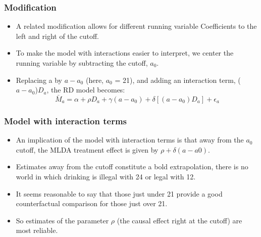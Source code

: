 \documentclass{beamer}
\begin{document}
\begin{frame}
\frametitle{Modification}
\begin{itemize}
	\item A related modification allows for different running variable Coefficients to the left and right of the cutoff.
	\item To make the model with interactions easier to interpret, we center the running variable by subtracting the cutoff, $a_0$. 
	\item Replacing a by $a - a_0$ (here, $a_0$ = 21), and adding an interaction term, ($a - a_0$)$D_a$, the RD model becomes:
$$\bar{M}_a=\alpha + \rho D_a + \gamma (a - a_0) + \delta[(a - a_0)D_a] + \epsilon_a $$
\end{itemize}

\end{frame}
\begin{frame}
\frametitle{Model with interaction terms}
\begin{itemize}
	\item An implication of the model with interaction terms is that away from the $a_0$ cutoff, the MLDA treatment effect is given by $\rho + \delta(a - a0)$.
	\item Estimates away from the cutoff constitute a bold extrapolation, there is no world in which drinking is illegal with 24 or legal with 12.
	\item It seems reasonable to say that those just under 21 provide a good counterfactual comparison for those just over 21. 
	\item So estimates of the parameter $\rho$ (the causal effect right at the cutoff) are most reliable.
\end{itemize}

\end{frame}
\end{document}
